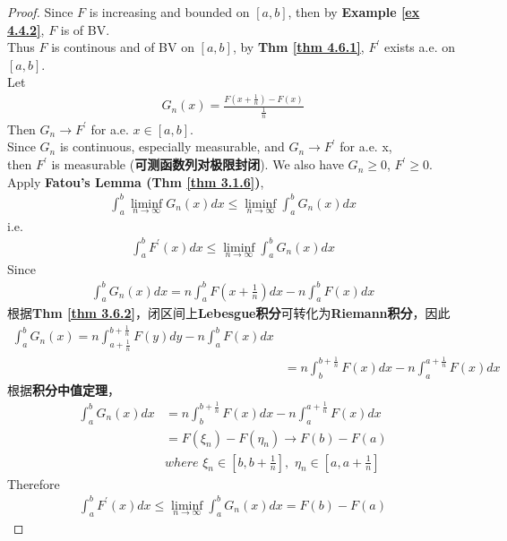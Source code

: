 \begin{corollary}
		\newpage
		\begin{proof}
			Since $F$ is increasing and bounded on $[a , b]$, then by \textbf{Example \ref{ex 4.4.2}}, $F$ is of BV. \\
			Thus $F$ is continous and of BV on $[a , b]$, by \textbf{Thm \ref{thm 4.6.1}}, $F^{'}$ exists a.e. on $[a , b]$. \\
			Let 
			\begin{align}
				G_{n}(x) = \frac{F(x + \frac{1}{n}) - F(x)}{\frac{1}{n}}
			\end{align}
			Then $G_n \to F^{'}$ for a.e. $x \in [a , b]$. \\
			Since $G_n$ is continuous, especially measurable, and $G_n \to F^{'}$ for a.e. x, \\
			then $F^{'}$ is measurable (\textbf{可测函数列对极限封闭}). We also have $G_n \geq 0$, $F^{'} \geq 0$. \\
			Apply \textbf{Fatou's Lemma (Thm \ref{thm 3.1.6})},
			\begin{align}
				\int_{a}^{b}{\liminf_{n \to \infty}{G_{n}(x)} dx} \leq \liminf_{n \to \infty}{\int_{a}^{b}{G_{n}(x) dx}}
			\end{align}
			i.e.
			\begin{align}
				\int_{a}^{b}{F^{'}(x) dx} \leq \liminf_{n \to \infty}{\int_{a}^{b}{G_{n}(x) dx}}
			\end{align}
			Since
			\begin{align}
				\int_{a}^{b}{G_{n}(x) dx}
				= n\int_{a}^{b}{F(x + \frac{1}{n}) dx} - n\int_{a}^{b}{F(x) dx}
			\end{align}
			根据\textbf{Thm \ref{thm 3.6.2}}，闭区间上\textbf{Lebesgue积分}可转化为\textbf{Riemann积分}，因此
			\begin{align}
				\int_{a}^{b}{G_{n}(x)}
				= n\int_{a + \frac{1}{n}}^{b + \frac{1}{n}}{F(y) dy} - n\int_{a}^{b}{F(x) dx} \\
				&= n\int_{b}^{b + \frac{1}{n}}{F(x) dx} - n\int_{a}^{a + \frac{1}{n}}{F(x) dx}
			\end{align}
			根据\textbf{积分中值定理}，
			\begin{align}
				\int_{a}^{b}{G_{n}(x) dx}
				&= n\int_{b}^{b + \frac{1}{n}}{F(x) dx} - n\int_{a}^{a + \frac{1}{n}}{F(x) dx} \\
				&= F(\xi_n) - F(\eta_n) \to F(b) - F(a) \\
				&where \,\, \xi_n \in [b , b + \frac{1}{n}] , \,\, \eta_n \in [a , a + \frac{1}{n}]
			\end{align}
			Therefore
			\begin{align}
				\int_{a}^{b}{F^{'}(x) dx} 
				\leq \liminf_{n \to \infty}{\int_{a}^{b}{G_{n}(x) dx}}
				= F(b) - F(a)
			\end{align}
		\end{proof}
	\end{corollary}

